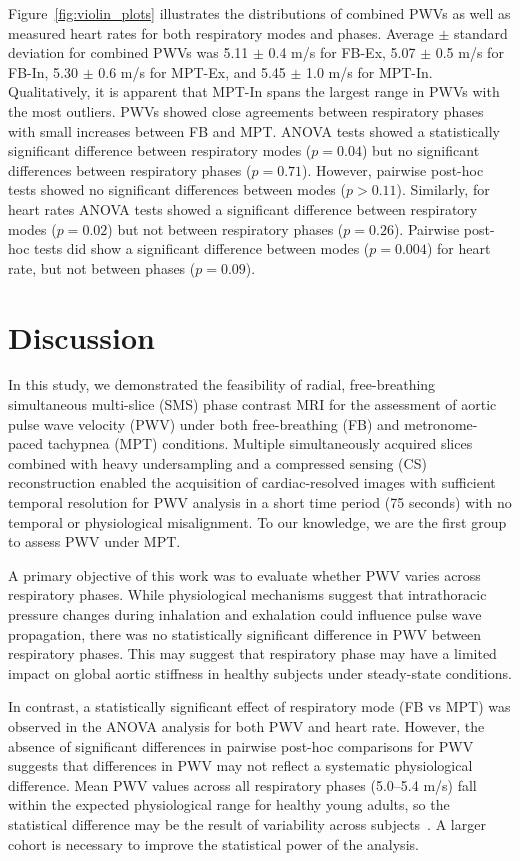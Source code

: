 Figure~\ref{fig:violin_plots} illustrates the distributions of combined PWVs as well as measured heart rates for both respiratory modes and phases. Average $\pm$ standard deviation for combined PWVs was 5.11 $\pm$ 0.4 m/s for FB-Ex, 5.07 $\pm$ 0.5 m/s for FB-In, 5.30 $\pm$ 0.6 m/s for MPT-Ex, and 5.45 $\pm$ 1.0 m/s for MPT-In. Qualitatively, it is apparent that MPT-In spans the largest range in PWVs with the most outliers. PWVs showed close agreements between respiratory phases with small increases between FB and MPT\@. ANOVA tests showed a statistically significant difference between respiratory modes ($p = 0.04$) but no significant differences between respiratory phases ($p = 0.71$). However, pairwise post-hoc tests showed no significant differences between modes ($p > 0.11$). Similarly, for heart rates ANOVA tests showed a significant difference between respiratory modes ($p = 0.02$) but not between respiratory phases ($p = 0.26$). Pairwise post-hoc tests did show a significant difference between modes ($p = 0.004$) for heart rate, but not between phases ($p = 0.09$).

\section{Discussion}\label{sec:sms_discussion}
In this study, we demonstrated the feasibility of radial, free-breathing simultaneous multi-slice (SMS) phase contrast MRI for the assessment of aortic pulse wave velocity (PWV) under both free-breathing (FB) and metronome-paced tachypnea (MPT) conditions. Multiple simultaneously acquired slices combined with heavy undersampling and a compressed sensing (CS) reconstruction enabled the acquisition of cardiac-resolved images with sufficient temporal resolution for PWV analysis in a short time period (75 seconds) with no temporal or physiological misalignment. To our knowledge, we are the first group to assess PWV under MPT\@.

A primary objective of this work was to evaluate whether PWV varies across respiratory phases. While physiological mechanisms suggest that intrathoracic pressure changes during inhalation and exhalation could influence pulse wave propagation, there was no statistically significant difference in PWV between respiratory phases. This may suggest that respiratory phase may have a limited impact on global aortic stiffness in healthy subjects under steady-state conditions.

In contrast, a statistically significant effect of respiratory mode (FB vs MPT) was observed in the ANOVA analysis for both PWV and heart rate. However, the absence of significant differences in pairwise post-hoc comparisons for PWV suggests that differences in PWV may not reflect a systematic physiological difference. Mean PWV values across all respiratory phases (5.0--5.4 m/s) fall within the expected physiological range for healthy young adults, so the statistical difference may be the result of variability across subjects~\cite{diazReferenceValuesPulse2014}. A larger cohort is necessary to improve the statistical power of the analysis.

